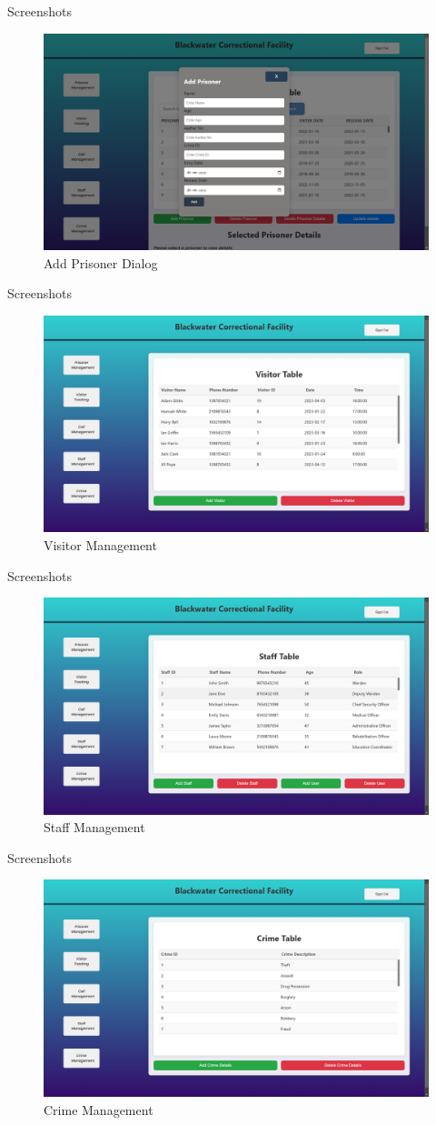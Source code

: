 \documentclass[aspectratio=169]{beamer}
\begin{document}
\begin{frame}{Screenshots}
    \begin{figure}
        \centering
        \includegraphics[width=0.6\linewidth]{addprisoner.png}
        \caption{Add Prisoner Dialog}
        \label{fig:addp}
    \end{figure}
\end{frame}
\begin{frame}{Screenshots}
    \begin{figure}
        \centering
        \includegraphics[width=0.6\linewidth]{visitor.png}
        \caption{Visitor Management}
        \label{fig:visitor}
    \end{figure}
\end{frame}
\begin{frame}{Screenshots}
    \begin{figure}
        \centering
        \includegraphics[width=0.6\linewidth]{staff.png}
        \caption{Staff Management}
        \label{fig:staff}
    \end{figure}
\end{frame}
\begin{frame}{Screenshots}
    \begin{figure}
        \centering
        \includegraphics[width=0.6\linewidth]{crime.png}
        \caption{Crime Management}
        \label{fig:crime}
    \end{figure}
\end{frame}
\end{document}
